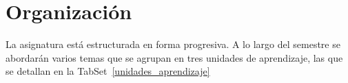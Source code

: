\section{Organización}

La asignatura está estructurada en forma progresiva. A lo largo del semestre se abordarán varios temas que se agrupan en tres unidades de aprendizaje, las que se detallan en la TabSet~\ref{unidades_aprendizaje}